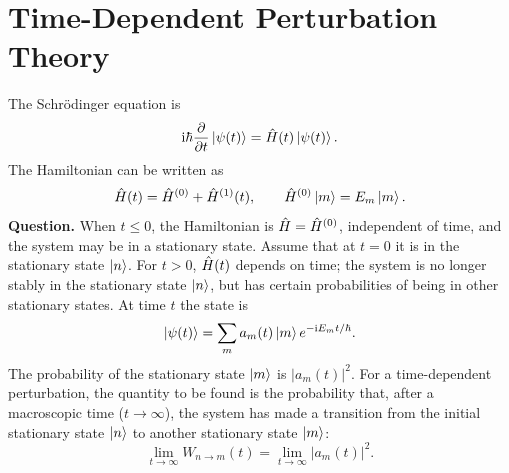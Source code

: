 \section{Time-Dependent Perturbation Theory}
The Schr\"odinger equation is
\begin{equation}
 \mathrm{i}\hbar\frac{\partial}{\partial t}\left|\psi(t)\right\rangle
 =\hat{H}(t)\left|\psi(t)\right\rangle.
\end{equation}
The Hamiltonian can be written as
\begin{equation}
 \hat{H}(t)=\hat{H}^{(0)}+\hat{H}^{(1)}(t),
 \qquad \hat{H}^{(0)}\left|m\right\rangle=E_m\left|m\right\rangle.
\end{equation}
\textbf{Question.} When $t\le0$, the Hamiltonian is $\hat{H}=\hat{H}^{(0)}$, independent of time, and the system may be in a stationary state. Assume that at $t=0$ it is in the stationary state $\left|n\right\rangle$. For $t>0$, $\hat{H}(t)$ depends on time; the system is no longer stably in the stationary state $\left|n\right\rangle$, but has certain probabilities of being in other stationary states. At time $t$ the state is
\begin{equation}
 \left|\psi(t)\right\rangle=\sum_m a_m(t)\left|m\right\rangle e^{-\mathrm{i} E_mt/\hbar}.
\end{equation}
The probability of the stationary state $\left|m\right\rangle$ is $|a_m(t)|^2$. For a time-dependent perturbation, the quantity to be found is the probability that, after a macroscopic time ($t\to\infty$), the system has made a transition from the initial stationary state $\left|n\right\rangle$ to another stationary state $\left|m\right\rangle$:
\begin{equation}
 \lim_{t\to\infty}W_{n\to m}(t)
 =\lim_{t\to\infty}|a_m(t)|^2.
\end{equation}
